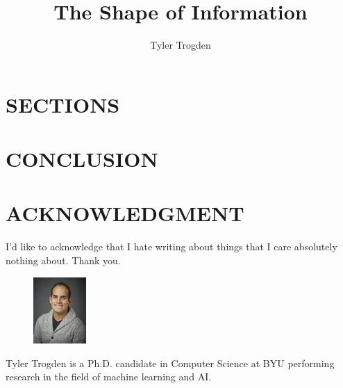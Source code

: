 \documentclass{IEEEcsmag}
\begin{document}
\setcounter{page}{1}
\title{The Shape of Information}

\author{Tyler Trogden}


\begin{abstract}
\end{abstract}

\maketitle

\chapterinitial{}


\section{SECTIONS}


\section{CONCLUSION}



\section{ACKNOWLEDGMENT}
I'd like to acknowledge that I hate writing about things that I care absolutely nothing
about. Thank you.




\begin{figure}
  \centering
  \vspace{-5mm}
  \includegraphics[width=0.18\textwidth]{portrait.jpg}
  \end{figure}\begin{IEEEbiography}{Tyler Trogden} is a Ph.D. candidate 
in Computer Science at BYU performing research in the field of machine learning
and AI.
\end{IEEEbiography}
\end{document}
